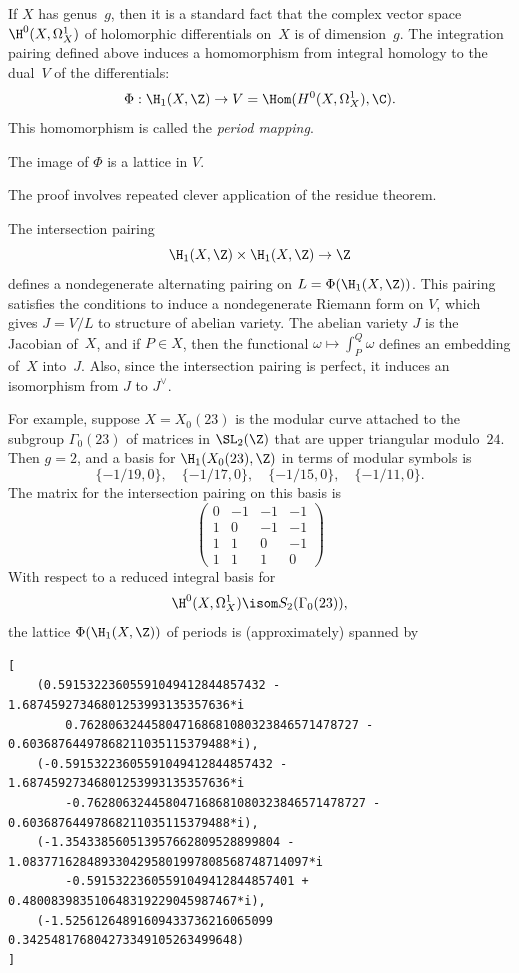 \documentclass{report}
\begin{document}
If $X$ has genus~$g$, then it is a standard fact that the complex
vector space $\H^0(X,\Omega^1_{X})$ of holomorphic differentials
on~$X$ is of dimension~$g$.  The integration pairing defined above
induces a homomorphism from integral homology to the dual~$V$ of
the differentials:
\[
\Phi:  \H_1(X,\Z) \to V=\Hom(H^0(X,\Omega^1_X), \C).
\]
This homomorphism is called the {\em period mapping}.

\begin{theorem}
The image of $\Phi$ is a lattice in $V$.
\end{theorem}
The proof involves repeated clever application of the residue
theorem.

The intersection pairing
\[
  \H_1(X,\Z)\times \H_1(X,\Z) \to \Z
\]
defines a nondegenerate alternating pairing on
$L=\Phi(\H_1(X,\Z))$.  This pairing satisfies the conditions to
induce a nondegenerate Riemann form on $V$, which gives $J=V/L$ to
structure of abelian variety.  The abelian variety $J$ is the
Jacobian of~$X$, and if $P\in X$, then the functional
$\omega\mapsto \int_{P}^Q \omega$ defines an embedding of~$X$
into~$J$.  Also, since the intersection pairing is perfect, it
induces an isomorphism from $J$ to $J^{\vee}$.

\begin{example}
For example, suppose $X=X_0(23)$ is the modular curve attached to
the subgroup $\Gamma_0(23)$ of matrices in $\SL_2(\Z)$ that are
upper triangular modulo~$24$.  Then $g=2$, and a basis for
$\H_1(X_0(23),\Z)$ in terms of modular symbols is
\[
    \{-1/19, 0\},\quad
    \{-1/17, 0\},\quad
    \{-1/15, 0\},\quad
    \{-1/11, 0\}.
\]
The matrix for the intersection pairing on this basis is
\[
\left(\begin{matrix}0&-1&-1&-1\\1&0&-1&-1\\1&1&0&-1\\1&1&1&0\end{matrix}\right)
\]
With respect to a reduced integral basis for
$$\H^0(X,\Omega^1_X) \isom S_2(\Gamma_0(23)),$$
the lattice $\Phi(\H_1(X,\Z))$ of periods is (approximately)
spanned by
\begin{verbatim}
[
    (0.59153223605591049412844857432 - 1.68745927346801253993135357636*i
        0.762806324458047168681080323846571478727 - 0.60368764497868211035115379488*i),
    (-0.59153223605591049412844857432 - 1.68745927346801253993135357636*i
        -0.762806324458047168681080323846571478727 - 0.60368764497868211035115379488*i),
    (-1.354338560513957662809528899804 - 1.0837716284893304295801997808568748714097*i
        -0.59153223605591049412844857401 + 0.480083983510648319229045987467*i),
    (-1.52561264891609433736216065099 0.342548176804273349105263499648)
]
\end{verbatim}
\end{example}
%
\end{document}
